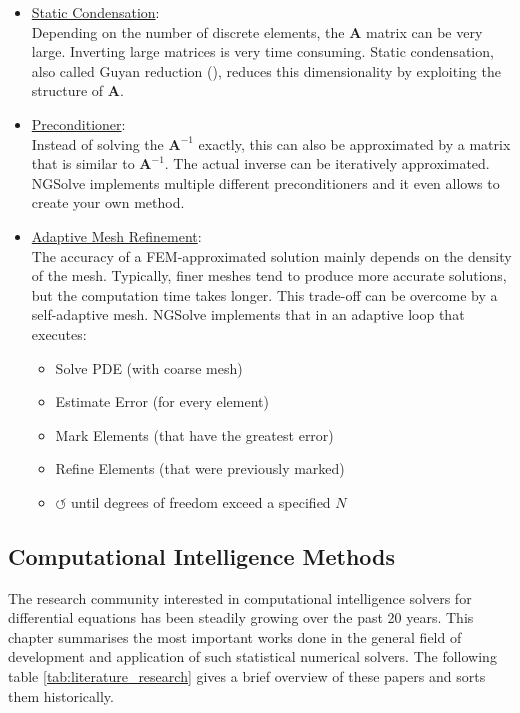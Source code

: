 \documentclass[./\jobname.tex]{subfiles}
\begin{document}
\begin{itemize}
	\item \underline{Static Condensation}: \\
		  Depending on the number of discrete elements, the $\mathbf{A}$ matrix can be very large. Inverting large matrices is very time consuming. Static condensation, also called Guyan reduction (\cite{guyan_reduction_1965}), reduces this dimensionality by exploiting the structure of $\mathbf{A}$. 
	\item \underline{Preconditioner}: \\
		  Instead of solving the $\mathbf{A}^{-1}$ exactly, this can also be approximated by a matrix that is similar to $\mathbf{A}^{-1}$. The actual inverse can be iteratively approximated. NGSolve implements multiple different preconditioners and it even allows to create your own method. 
		  
\newpage		  
		   
	\item \underline{Adaptive Mesh Refinement}: \\
		The accuracy of a FEM-approximated solution mainly depends on the density of the mesh. Typically, finer meshes tend to produce more accurate solutions, but the computation time takes longer. This trade-off can be overcome by a self-adaptive mesh. NGSolve implements that in an adaptive loop that executes: 
		\begin{itemize}
			\item Solve PDE (with coarse mesh)
			\item Estimate Error (for every element)
			\item Mark Elements (that have the greatest error)
			\item Refine Elements (that were previously marked)
			\item $\mathbf{\circlearrowleft}$  until degrees of freedom exceed a specified $N$
		\end{itemize}
\end{itemize}


\subsection{Computational Intelligence Methods} 
\label{chap:literature_overview}

The research community interested in computational intelligence solvers for differential equations has been steadily growing over the past 20 years. This chapter summarises the most important works done in the general field of development and application of such statistical numerical solvers. The following table \ref{tab:literature_research} gives a brief overview of these papers and sorts them historically. 
\end{document}

